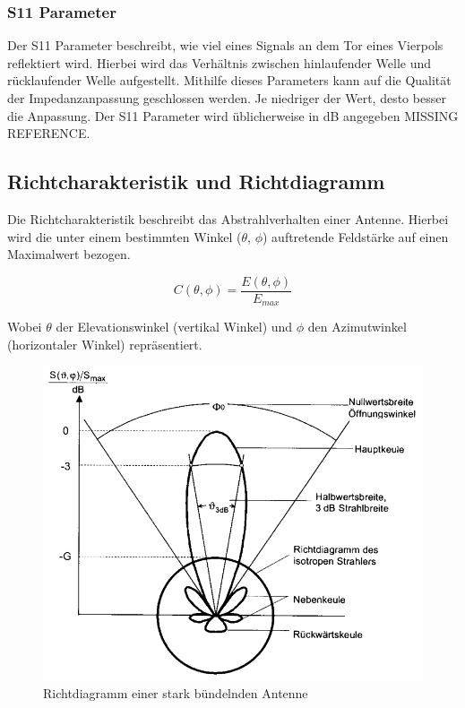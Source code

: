 \subsubsection{S11 Parameter}
Der S11 Parameter beschreibt, wie viel eines Signals an dem Tor eines Vierpols reflektiert wird. Hierbei wird das Verhältnis zwischen hinlaufender Welle und rücklaufender Welle aufgestellt. Mithilfe dieses Parameters kann auf die Qualität der Impedanzanpassung geschlossen werden. Je niedriger der Wert, desto besser die Anpassung. Der S11 Parameter wird üblicherweise in dB angegeben MISSING REFERENCE.

\subsection{Richtcharakteristik und Richtdiagramm}
Die Richtcharakteristik beschreibt das Abstrahlverhalten einer Antenne. Hierbei wird die unter einem bestimmten Winkel ($\theta$, $\phi$) auftretende Feldstärke auf einen Maximalwert bezogen.

\begin{equation}
	C(\theta, \phi)=\frac{E(\theta, \phi)}{E_{max}}
\end{equation}

Wobei $\theta$ der Elevationswinkel (vertikal Winkel) und $\phi$ den Azimutwinkel (horizontaler Winkel) repräsentiert.

\begin{figure}[H]
	\centering
	\includegraphics[width=\textwidth]{../ref/Richtdiagramm_Beispiel}
	\caption{Richtdiagramm einer stark bündelnden Antenne}
	\label{fig:Richtdiagramm Beispiel}
\end{figure}

